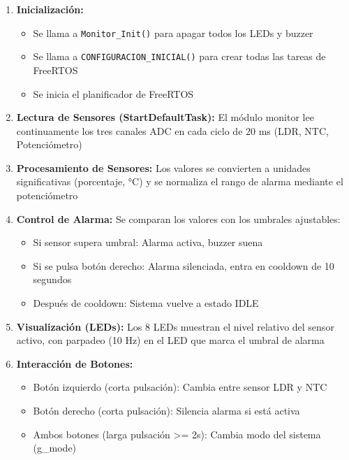\documentclass[12pt,a4paper]{article}
\begin{document}
\begin{enumerate}
    \item \textbf{Inicialización:} 
    \begin{itemize}
        \item Se llama a \texttt{Monitor\_Init()} para apagar todos los LEDs y buzzer
        \item Se llama a \texttt{CONFIGURACION\_INICIAL()} para crear todas las tareas de FreeRTOS
        \item Se inicia el planificador de FreeRTOS
    \end{itemize}
    
    \item \textbf{Lectura de Sensores (StartDefaultTask):} El módulo monitor lee continuamente los tres canales ADC en cada ciclo de 20 ms (LDR, NTC, Potenciómetro)
    
    \item \textbf{Procesamiento de Sensores:} Los valores se convierten a unidades significativas (porcentaje, °C) y se normaliza el rango de alarma mediante el potenciómetro
    
    \item \textbf{Control de Alarma:} Se comparan los valores con los umbrales ajustables:
    \begin{itemize}
        \item Si sensor supera umbral: Alarma activa, buzzer suena
        \item Si se pulsa botón derecho: Alarma silenciada, entra en cooldown de 10 segundos
        \item Después de cooldown: Sistema vuelve a estado IDLE
    \end{itemize}
    
    \item \textbf{Visualización (LEDs):} Los 8 LEDs muestran el nivel relativo del sensor activo, con parpadeo (10 Hz) en el LED que marca el umbral de alarma
    
    \item \textbf{Interacción de Botones:}
    \begin{itemize}
        \item Botón izquierdo (corta pulsación): Cambia entre sensor LDR y NTC
        \item Botón derecho (corta pulsación): Silencia alarma si está activa
        \item Ambos botones (larga pulsación >= 2s): Cambia modo del sistema (g\_mode)
    \end{itemize}
    

\end{enumerate}
\end{document}

